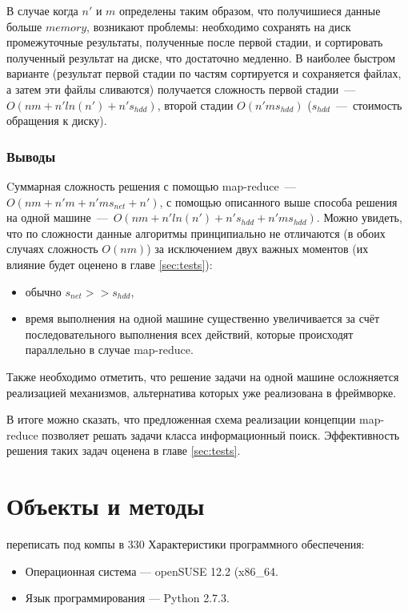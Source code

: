 \documentclass[12pt,a4paper,oneside]{extarticle}
\begin{document}
            В случае когда $n'$ и $m$ определены таким образом, что получишиеся данные больше $memory$, возникают проблемы: необходимо сохранять на диск промежуточные результаты, полученные после первой стадии, и сортировать полученный результат на диске, что достаточно медленно. В наиболее быстром варианте (результат первой стадии по частям сортируется и сохраняется файлах, а затем эти файлы сливаются) получается сложность первой стадии~---~$O(nm+n'ln(n')+n's_{hdd})$, второй стадии $O(n'ms_{hdd})$ ($s_{hdd}$~---~стоимость обращения к диску).

        \subsubsection{Выводы}
            Cуммарная сложность решения с помощью map-reduce~---~$O(nm+n'm+n'ms_{net}+n')$, с помощью описанного выше способа решения на одной машине~---~$O(nm+n'ln(n')+n's_{hdd}+n'ms_{hdd})$. Можно увидеть, что по сложности данные алгоритмы принципиально не отличаются (в обоих случаях сложность $O(nm)$) за исключением двух важных моментов (их влияние будет оценено в главе \ref{sec:tests}):
            \begin{itemize}
                \item обычно $s_{net}>>s_{hdd}$,
                \item время выполнения на одной машине существенно увеличивается за счёт последовательного выполнения всех действий, которые происходят параллельно в случае map-reduce.
            \end{itemize}

            Также необходимо отметить, что решение задачи на одной машине осложняется реализацией механизмов, альтернатива которых уже реализована в фреймворке. 

            В итоге можно сказать, что предложенная схема реализации концепции map-reduce позволяет решать задачи класса информационный поиск. Эффективность решения таких задач оценена в главе \ref{sec:tests}.
        
    \clearpage
\clearpage

\section{Объекты и методы} 
        переписать под компы в 330   
        \noindent Характеристики программного обеспечения:
        \begin{itemize}
            \item Операционная система --- openSUSE 12.2 (x86_64.
            \item Язык программирования --- Python 2.7.3.
        \end{itemize}
        
\end{document}
